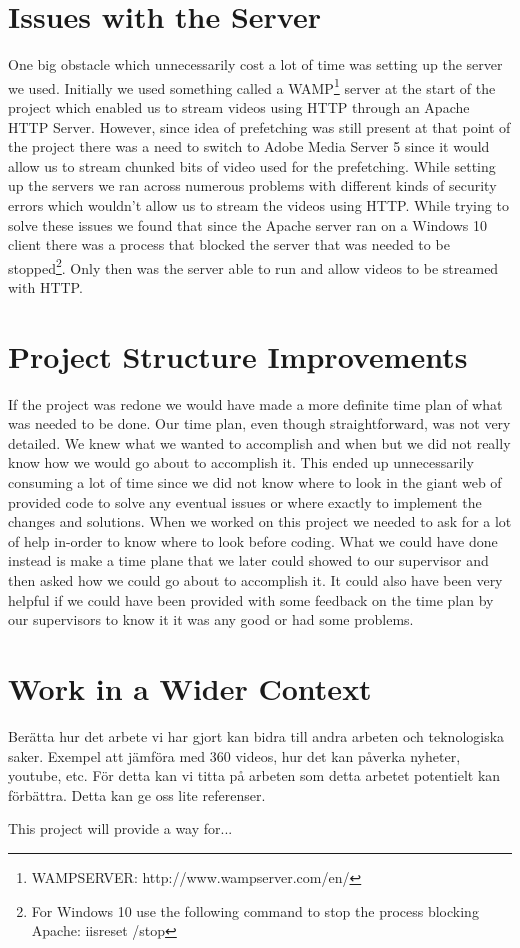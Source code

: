 \section{Issues with the Server}
\label{sec:serverissues}

One big obstacle which unnecessarily cost a lot of time was setting up the server we used. Initially we used something called a WAMP\footnote{WAMPSERVER: http://www.wampserver.com/en/} server at the start of the project which enabled us to stream videos using HTTP through an Apache HTTP Server. However, since idea of prefetching was still present at that point of the project there was a need to switch to Adobe Media Server 5 since it would allow us to stream chunked bits of video used for the prefetching. While setting up the servers we ran across numerous problems with different kinds of security errors which wouldn’t allow us to stream the videos using HTTP. While trying to solve these issues we found that since the Apache server ran on a Windows 10 client there was a process that blocked the server that was needed to be stopped\footnote{For Windows 10 use the following command to stop the process blocking Apache: iisreset /stop}. Only then was the server able to run and allow videos to be streamed with HTTP.

\section{Project Structure Improvements}
\label{sec:psi}

If the project was redone we would have made a more definite time plan of what was needed to be done. Our time plan, even though straightforward, was not very detailed. We knew what we wanted to accomplish and when but we did not really know how we would go about to accomplish it. This ended up unnecessarily consuming a lot of time since we did not know where to look in the giant web of provided code to solve any eventual issues or where exactly to implement the changes and solutions. When we worked on this project we needed to ask for a lot of help in-order to know where to look before coding. What we could have done instead is make a time plane that we later could showed to our supervisor and then asked how we could go about to accomplish it. It could also have been very helpful if we could have been provided with some feedback on the time plan by our supervisors to know it it was any good or had some problems. 

\section{Work in a Wider Context}
\label{sec:workinawidercontext}
Berätta hur det arbete vi har gjort kan bidra till andra arbeten och teknologiska saker. Exempel att jämföra med 360 videos, hur det kan påverka nyheter, youtube, etc. För detta kan vi titta på arbeten som detta arbetet potentielt kan förbättra. Detta kan ge oss lite referenser.

This project will provide a way for...
